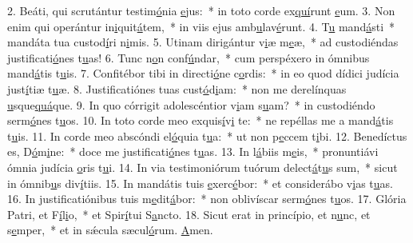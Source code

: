 2. Beáti, qui scrutántur testim\uline{ó}nia \uline{e}jus:~* in toto corde ex\uline{quí}runt \uline{e}um.
3. Non enim qui operántur in\uline{i}quit\uline{á}tem,~* in viis ejus amb\uline{u}lav\uline{é}runt.
4. T\uline{u} mand\uline{á}sti~* mandáta tua custod\uline{í}ri n\uline{i}mis.
5. Utinam dirigántur v\uline{i}æ m\uline{e}æ,~* ad custodiéndas justificati\uline{ó}nes t\uline{u}as!
6. Tunc n\uline{o}n conf\uline{ú}ndar,~* cum perspéxero in ómnibus mand\uline{á}tis t\uline{u}is.
7. Confitébor tibi in directi\uline{ó}ne c\uline{o}rdis:~* in eo quod dídici judícia just\uline{í}tiæ t\uline{u}æ.
8. Justificatiónes tuas cust\uline{ó}d\uline{i}am:~* non me derelínquas \uline{u}sque\uline{quá}que.
9. In quo córrigit adolescéntior v\uline{i}am s\uline{u}am?~* in custodiéndo serm\uline{ó}nes t\uline{u}os.
10. In toto corde meo exquis\uline{í}v\uline{i} te:~* ne repéllas me a mand\uline{á}tis t\uline{u}is.
11. In corde meo abscóndi el\uline{ó}quia t\uline{u}a:~* ut non p\uline{e}ccem t\uline{i}bi.
12. Benedíctus es, D\uline{ó}m\uline{i}ne:~* doce me justificati\uline{ó}nes t\uline{u}as.
13. In l\uline{á}biis m\uline{e}is,~* pronuntiávi ómnia judícia \uline{o}ris t\uline{u}i.
14. In via testimoniórum tuórum delect\uline{á}t\uline{u}s sum,~* sicut in ómnib\uline{u}s div\uline{í}tiis.
15. In mandátis tuis \uline{e}xerc\uline{é}bor:~* et considerábo v\uline{i}as t\uline{u}as.
16. In justificatiónibus tuis m\uline{e}dit\uline{á}bor:~* non oblivíscar serm\uline{ó}nes t\uline{u}os.
17. Glória Patri, et F\uline{í}l\uline{i}o,~* et Spir\uline{í}tui S\uline{a}ncto.
18. Sicut erat in princípio, et n\uline{u}nc, et s\uline{e}mper,~* et in sǽcula sæcul\uline{ó}rum. \uline{A}men.
